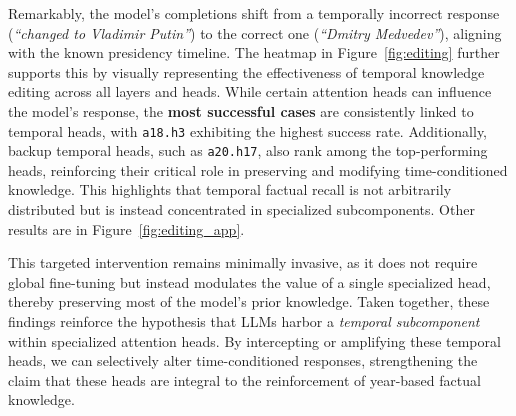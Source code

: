 Remarkably, the model’s completions shift from a temporally incorrect response (\textit{“changed to Vladimir Putin”}) to the correct one (\textit{“Dmitry Medvedev”}), aligning with the known presidency timeline.
The heatmap in Figure~\ref{fig:editing} further supports this by visually representing the effectiveness of temporal knowledge editing across all layers and heads.  
While certain attention heads can influence the model’s response, the \textbf{most successful cases} are consistently linked to temporal heads, with \verb|a18.h3| exhibiting the highest success rate.  
Additionally, backup temporal heads, such as \verb|a20.h17|, also rank among the top-performing heads, reinforcing their critical role in preserving and modifying time-conditioned knowledge.  
This highlights that temporal factual recall is not arbitrarily distributed but is instead concentrated in specialized subcomponents.
Other results are in Figure~\ref{fig:editing_app}.

This targeted intervention remains minimally invasive, as it does not require global fine-tuning but instead modulates the value of a single specialized head, thereby preserving most of the model’s prior knowledge.  
Taken together, these findings reinforce the hypothesis that LLMs harbor a \emph{temporal subcomponent} within specialized attention heads.  
By intercepting or amplifying these temporal heads, we can selectively alter time-conditioned responses, strengthening the claim that these heads are integral to the reinforcement of year-based factual knowledge.
